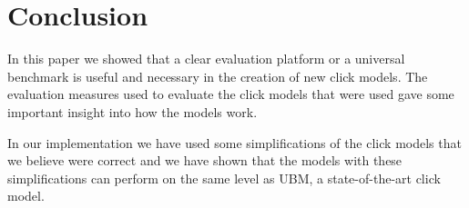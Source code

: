 \section{Conclusion}
\label{sec:conclusion}
In this paper we showed that a clear evaluation platform or a universal benchmark is useful and necessary in the creation of new click models. The evaluation measures used to evaluate the click models that were used gave some important insight into how the models work.

In our implementation we have used some simplifications of the click models that we believe were correct and we have shown that the models with these simplifications can perform on the same level as UBM, a state-of-the-art click model. 
